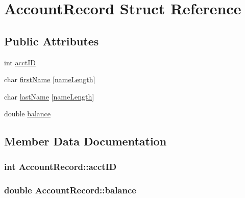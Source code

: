 \hypertarget{struct_account_record}{}\section{Account\+Record Struct Reference}
\label{struct_account_record}
\subsection*{Public Attributes}
\begin{DoxyCompactItemize}
\item 
int \hyperlink{struct_account_record_a587aa92adcd387d37427cd19c69e5932}{acct\+ID}
\item 
char \hyperlink{struct_account_record_a89df48cc152b78efda9060a0cc461dd1}{first\+Name} \mbox{[}\hyperlink{database_8cpp_a5d9687231dabb10b55cd7598e1be6702}{name\+Length}\mbox{]}
\item 
char \hyperlink{struct_account_record_ab9b4c37852573096dd9c81bec70f68b9}{last\+Name} \mbox{[}\hyperlink{database_8cpp_a5d9687231dabb10b55cd7598e1be6702}{name\+Length}\mbox{]}
\item 
double \hyperlink{struct_account_record_a7de857c68a45702a0c1c4720b4570c2a}{balance}
\end{DoxyCompactItemize}


\subsection{Member Data Documentation}
\subsubsection[{\texorpdfstring{acct\+ID}{acctID}}]{\setlength{\rightskip}{0pt plus 5cm}int Account\+Record\+::acct\+ID}\hypertarget{struct_account_record_a587aa92adcd387d37427cd19c69e5932}{}\label{struct_account_record_a587aa92adcd387d37427cd19c69e5932}
\subsubsection[{\texorpdfstring{balance}{balance}}]{\setlength{\rightskip}{0pt plus 5cm}double Account\+Record\+::balance}\hypertarget{struct_account_record_a7de857c68a45702a0c1c4720b4570c2a}{}\label{struct_account_record_a7de857c68a45702a0c1c4720b4570c2a}
